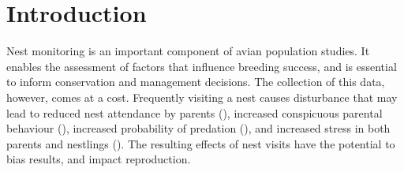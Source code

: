 \section{Introduction}














Nest monitoring is an important component of avian population studies.
It enables the assessment of factors that influence breeding success, and is essential to inform conservation and management decisions.
The collection of this data, however, comes at a cost.
Frequently visiting a nest causes disturbance that may lead to reduced nest attendance by parents (), increased conspicuous parental behaviour (), increased probability of predation (), and increased stress in both parents and nestlings ().
The resulting effects of nest visits have the potential to bias results, and impact reproduction.

 
 
 
 
